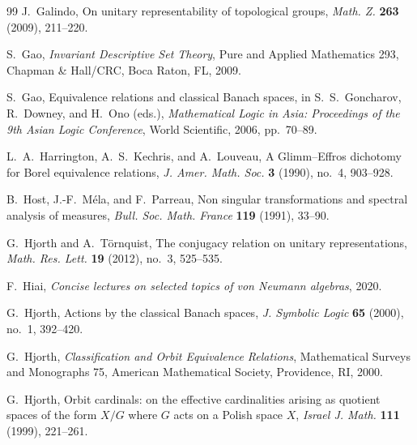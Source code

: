 \documentclass[11pt]{article}
\numberwithin{equation}{section}
\theoremstyle{definition}
\begin{document}
\begin{thebibliography}{99}
J.~Galindo,
On unitary representability of topological groups,
\emph{Math. Z.} \textbf{263} (2009), 211--220.

S.~Gao,
\emph{Invariant Descriptive Set Theory},
Pure and Applied Mathematics 293,
Chapman \& Hall/CRC, Boca Raton, FL, 2009.

S.~Gao,
Equivalence relations and classical Banach spaces,
in S.~S.~Goncharov, R.~Downey, and H.~Ono (eds.),
\emph{Mathematical Logic in Asia: Proceedings of the 9th Asian Logic Conference},
World Scientific, 2006, pp.~70--89.

L.~A.~Harrington, A.~S.~Kechris, and A.~Louveau,
A Glimm--Effros dichotomy for Borel equivalence relations,
\emph{J. Amer. Math. Soc.} \textbf{3} (1990), no.~4, 903--928.

B.~Host, J.-F.~M\'ela, and F.~Parreau,
Non singular transformations and spectral analysis of measures,
\emph{Bull. Soc. Math. France} \textbf{119} (1991), 33--90.

G.~Hjorth and A.~T\"ornquist,
The conjugacy relation on unitary representations,
\emph{Math. Res. Lett.} \textbf{19} (2012), no.~3, 525--535.

F.~Hiai,
\emph{Concise lectures on selected topics of von Neumann algebras},
2020. 

G.~Hjorth,
Actions by the classical Banach spaces,
\emph{J. Symbolic Logic} \textbf{65} (2000), no.~1, 392--420.

G.~Hjorth,
\emph{Classification and Orbit Equivalence Relations},
Mathematical Surveys and Monographs 75,
American Mathematical Society, Providence, RI, 2000.

G.~Hjorth,
Orbit cardinals: on the effective cardinalities arising as quotient spaces of
the form $X/G$ where $G$ acts on a Polish space $X$,
\emph{Israel J. Math.} \textbf{111} (1999), 221--261.


\end{thebibliography}
\end{document}
